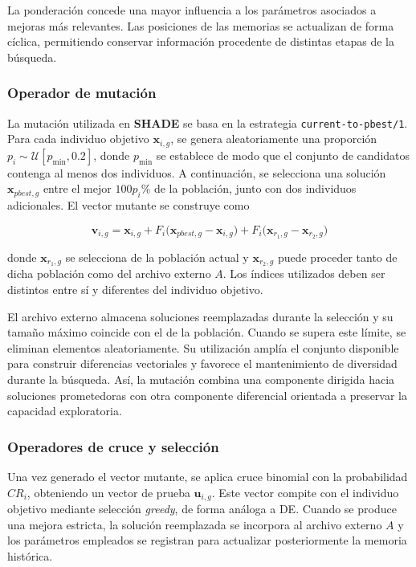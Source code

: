 La ponderación concede una mayor influencia a los parámetros asociados a mejoras más relevantes. Las posiciones de las memorias se actualizan de forma cíclica, permitiendo conservar información procedente de distintas etapas de la búsqueda.

\subsubsection{Operador de mutación}

La mutación utilizada en \textbf{SHADE} se basa en la estrategia \texttt{current-to-}\allowbreak\texttt{pbest/1}. Para cada individuo objetivo \(\mathbf{x}_{i,g}\), se genera aleatoriamente una proporción \(p_i \sim \mathcal{U}[p_{\min}, 0.2]\), donde \(p_{\min}\) se establece de modo que el conjunto de candidatos contenga al menos dos individuos. A continuación, se selecciona una solución \(\mathbf{x}_{pbest,g}\) entre el mejor \(100p_i\%\) de la población, junto con dos individuos adicionales. El vector mutante se construye como

\begin{equation}
    \mathbf{v}_{i,g}
    =
    \mathbf{x}_{i,g}
    +
    F_i \bigl(\mathbf{x}_{pbest,g} - \mathbf{x}_{i,g}\bigr)
    +
    F_i \bigl(\mathbf{x}_{r_1,g} - \mathbf{x}_{r_2,g}\bigr)
\end{equation}

donde \(\mathbf{x}_{r_1,g}\) se selecciona de la población actual y \(\mathbf{x}_{r_2,g}\) puede proceder tanto de dicha población como del archivo externo \(A\). Los índices utilizados deben ser distintos entre sí y diferentes del individuo objetivo.

El archivo externo almacena soluciones reemplazadas durante la selección y su tamaño máximo coincide con el de la población. Cuando se supera este límite, se eliminan elementos aleatoriamente. Su utilización amplía el conjunto disponible para construir diferencias vectoriales y favorece el mantenimiento de diversidad durante la búsqueda. Así, la mutación combina una componente dirigida hacia soluciones prometedoras con otra componente diferencial orientada a preservar la capacidad exploratoria.

\subsubsection{Operadores de cruce y selección}

Una vez generado el vector mutante, se aplica cruce binomial con la probabilidad \(CR_i\), obteniendo un vector de prueba \(\mathbf{u}_{i,g}\). Este vector compite con el individuo objetivo mediante selección \textit{greedy}, de forma análoga a DE. Cuando se produce una mejora estricta, la solución reemplazada se incorpora al archivo externo \(A\) y los parámetros empleados se registran para actualizar posteriormente la memoria histórica.

